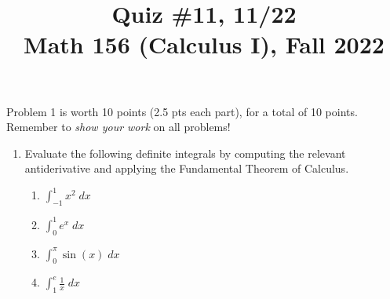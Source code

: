 \documentclass[11pt]{article}
\title{Quiz \#11, 11/22 \\ Math 156 (Calculus I), Fall 2022}
\date{}
\begin{document}
\maketitle

\thispagestyle{empty}

\vspace{-1cm}

Problem 1 is worth 10 points (2.5 pts each part), for a total of 10 points. Remember to \emph{show your work} on all problems!

\begin{enumerate}
\item Evaluate the following definite integrals by computing the relevant antiderivative and applying the Fundamental Theorem of Calculus.
\begin{enumerate}
\item $\int_{-1}^{1} x^2 \; dx$
\item $\int_{0}^{1} e^x \; dx$
\item $\int_{0}^{\pi} \sin(x) \; dx$
\item $\int_{1}^{e} \frac{1}{x} \; dx$
\end{enumerate}
\end{enumerate}
\end{document}
